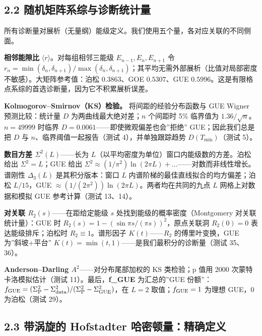 \documentclass[
]{article}
\begin{document}
\subsection{2.2
随机矩阵系综与诊断统计量}\label{ux968fux673aux77e9ux9635ux7cfbux7efcux4e0eux8bcaux65adux7edfux8ba1ux91cf}

所有诊断量对展析（无量纲）能级定义。我们使用五个量，各对应关联的不同侧面。

\textbf{相邻能隙比} \(\langle r\rangle\)。对每组相邻三能级
\(E_{n-1},E_n,E_{n+1}\) 令
\(r_n = \min(\delta_n,\delta_{n+1})/\max(\delta_n,\delta_{n+1})\)；其平均无需外部展析（比值对局部密度不敏感）。大矩阵参考值：泊松
\(0.3863\)、GOE \(0.5307\)、GUE
\(0.5996\)。这是有限格点系综的首选诊断量，因为它不积累展析误差。

\textbf{Kolmogorov--Smirnov（KS）检验。} 将间距的经验分布函数与 GUE
Wigner 预测比较：统计量 \(D\) 为两曲线最大绝对差；\(n\) 个间距时 5\%
临界值为 \(1.36/\sqrt{n}\)。\(n = 49999\) 时临界
\(D = 0.0061\)------即使微观偏差也会''拒绝'' GUE；因此我们总是把 \(D\)
与 \(n\)、临界阈值一起报告（测试 4），并单独跟踪趋势
\(D(T_{\min})\)（测试 5）。

\textbf{数目方差 \(\Sigma^2(L)\)}------长为
\(L\)（以平均密度为单位）窗口内能级数的方差。泊松给出
\(\Sigma^2 = L\)；GUE 给出
\(\Sigma^2 \approx (1/\pi^2)\ln(2\pi L) + \ldots\)------对数而非线性增长。谱刚性
\(\Delta_3(L)\) 是其积分版本：窗口 \(L\)
内谱阶梯的最佳直线拟合的均方偏差；泊松 \(L/15\)，GUE
\(\approx (1/(2\pi^2))\ln(2\pi L)\)。两者均在共同的九点 \(L\) 网格上对数据和模拟
GUE 参考计算（测试 13、14）。

\textbf{对关联 \(R_2(s)\)}------在距给定能级 \(s\)
处找到能级的概率密度（Montgomery 对关联统计量）：GUE 时
\(R_2(s) = 1 - (\sin \pi s/(\pi s))^2\)，原点关联洞 \(R_2(0)=0\)
表达能级排斥；泊松时 \(R_2 \equiv 1\)。谱形因子 \(K(t)\)------\(R_2\)
的傅里叶变换，GUE 为''斜坡+平台''
\(K(t)=\min(t,1)\)------是我们最积分的诊断量（测试 35、36）。

\textbf{Anderson--Darling \(A^2\)}------对分布尾部加权的 KS 类检验；p
值用 2000 次蒙特卡洛模拟估计（测试 11）。最后，\textbf{f\_GUE}
为汇总的''GUE
份额''：\(f_{\rm GUE} = (\Sigma^2_{\rm P} - \Sigma^2_{\rm data})/(\Sigma^2_{\rm P} - \Sigma^2_{\rm GUE})\)，在
\(L=2\) 取值；\(f_{\rm GUE}=1\) 为理想 GUE，\(0\) 为泊松（测试 29）。

\subsection{2.3 带涡旋的 Hofstadter
哈密顿量：精确定义}\label{ux5e26ux6da1ux65cbux7684-hofstadter-ux54c8ux5bc6ux987fux91cfux7cbeux786eux5b9aux4e49}
\end{document}
